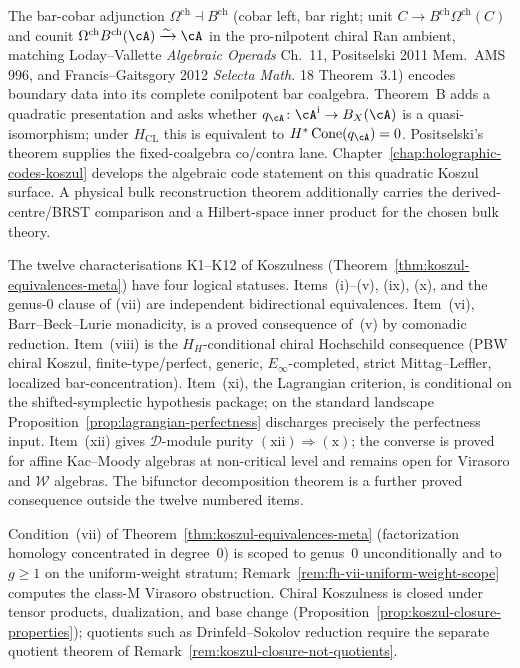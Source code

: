 The bar-cobar adjunction $\Omega^{\mathrm{ch}} \dashv B^{\mathrm{ch}}$
(cobar left, bar right; unit
$C\to B^{\mathrm{ch}}\Omega^{\mathrm{ch}}(C)$ and counit
$\Omega^{\mathrm{ch}}B^{\mathrm{ch}}(\cA)\xrightarrow{\sim}\cA$ in
the pro-nilpotent chiral Ran ambient, matching Loday--Vallette \emph{Algebraic Operads}
Ch.~11, Positselski 2011 Mem.\ AMS 996, and Francis--Gaitsgory 2012
\emph{Selecta Math.} 18 Theorem~3.1) encodes boundary data into its
complete conilpotent bar coalgebra. Theorem~B adds a quadratic
presentation and asks whether
$q_\cA\colon\cA^{\mathrm i}\to B_X(\cA)$ is a quasi-isomorphism;
under $H_{\mathrm{CL}}$ this is equivalent to
$H^*\operatorname{Cone}(q_\cA)=0$. Positselski's theorem supplies the
fixed-coalgebra co/contra lane. Chapter~\ref{chap:holographic-codes-koszul}
develops the algebraic code statement on this quadratic Koszul
surface. A physical bulk reconstruction theorem additionally carries
the derived-centre/BRST comparison and a Hilbert-space inner product
for the chosen bulk theory.

The twelve characterisations K1--K12 of Koszulness
(Theorem~\ref{thm:koszul-equivalences-meta}) have four logical
statuses. Items~(i)--(v), (ix), (x), and the genus-$0$ clause of
(vii) are independent bidirectional equivalences. Item~(vi),
Barr--Beck--Lurie monadicity, is a proved consequence of~(v) by
comonadic reduction. Item~(viii) is the $H_H$-conditional chiral
Hochschild consequence \textup{(}PBW chiral Koszul, finite-type/perfect,
generic, $E_\infty$-completed, strict Mittag--Leffler, localized
bar-concentration\textup{)}. Item~(xi), the Lagrangian criterion,
is conditional on the shifted-symplectic hypothesis package; on the
standard landscape Proposition~\ref{prop:lagrangian-perfectness}
discharges precisely the perfectness input. Item~(xii) gives $\mathcal{D}$-module purity
$(\mathrm{xii})\Rightarrow(\mathrm{x})$; the converse is proved for
affine Kac--Moody algebras at non-critical level and remains open for
Virasoro and $\mathcal{W}$ algebras. The bifunctor decomposition
theorem is a further proved consequence outside the twelve numbered
items.

Condition~(vii) of Theorem~\ref{thm:koszul-equivalences-meta} (factorization homology concentrated in degree~$0$) is scoped to genus~$0$ unconditionally and to $g \geq 1$ on the uniform-weight stratum; Remark~\ref{rem:fh-vii-uniform-weight-scope} computes the class-M Virasoro obstruction. Chiral Koszulness is closed under tensor products, dualization, and base change (Proposition~\ref{prop:koszul-closure-properties}); quotients such as Drinfeld--Sokolov reduction require the separate quotient theorem of Remark~\ref{rem:koszul-closure-not-quotients}.

